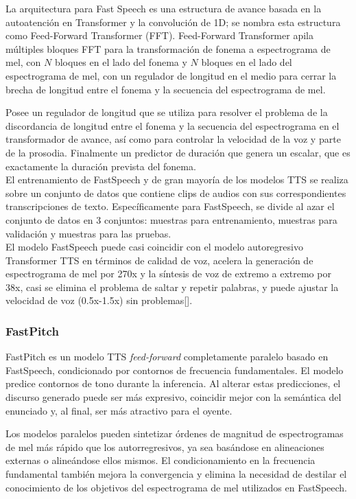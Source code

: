 La arquitectura para Fast Speech es una estructura de avance basada en la autoatención en Transformer y la convolución de 1D; se nombra esta estructura como Feed-Forward Transformer (FFT). Feed-Forward Transformer apila múltiples bloques FFT para la transformación de fonema a espectrograma de mel, con $N$ bloques en el lado del fonema y $N$ bloques en el lado del espectrograma de mel, con un regulador de longitud en el medio para cerrar la brecha de longitud entre el fonema y la secuencia del espectrograma de mel.

Posee un regulador de longitud que se utiliza para resolver el problema de la discordancia de longitud entre el fonema y la secuencia del espectrograma en el transformador de avance, así como para controlar la velocidad de la voz y parte de la prosodia. Finalmente un predictor de duración que genera un escalar, que es exactamente la duración prevista del fonema.\\


El entrenamiento de FastSpeech y de  gran mayoría de los modelos TTS se realiza sobre un conjunto de datos que contiene clips de audios con sus correspondientes transcripciones de texto. Específicamente para FastSpeech, se divide al azar el conjunto de datos en 3 conjuntos: muestras para entrenamiento, muestras para validación y muestras para las pruebas. \\


El modelo FastSpeech puede casi coincidir con el modelo autoregresivo Transformer TTS en términos de calidad de voz, acelera la generación de espectrograma de mel por 270x y la síntesis de voz de extremo a extremo por 38x, casi se elimina el problema de saltar y repetir palabras, y puede ajustar la velocidad de voz (0.5x-1.5x) sin problemas[\cite{ren2019fastspeech}].


\subsubsection{FastPitch}
FastPitch es un modelo TTS \textit{feed-forward} completamente paralelo basado en FastSpeech, condicionado por contornos de frecuencia fundamentales. El modelo predice contornos de tono durante la inferencia. Al alterar estas predicciones, el discurso generado puede ser más expresivo, coincidir mejor con la semántica del enunciado y, al final, ser más atractivo para el oyente.

Los modelos paralelos pueden sintetizar órdenes de magnitud de espectrogramas de mel más rápido que los autorregresivos, ya sea basándose en alineaciones externas o alineándose ellos mismos. El condicionamiento en la frecuencia fundamental también mejora la convergencia y elimina la necesidad de destilar el conocimiento de los objetivos del espectrograma de mel utilizados en FastSpeech.\\


